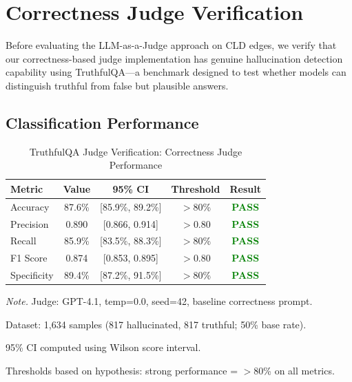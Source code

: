 \section{Correctness Judge Verification}

Before evaluating the LLM-as-a-Judge approach on CLD edges, we verify that our correctness-based judge implementation has genuine hallucination detection capability using TruthfulQA---a benchmark designed to test whether models can distinguish truthful from false but plausible answers.

\subsection{Classification Performance}

\begin{table}[H]
\centering
\caption{TruthfulQA Judge Verification: Correctness Judge Performance}
\label{tab:truthqa_performance}
\begin{threeparttable}
\begin{tabular}{lcccc}
\toprule
\textbf{Metric} & \textbf{Value} & \textbf{95\% CI} & \textbf{Threshold} & \textbf{Result} \\
\midrule
Accuracy & 87.6\% & [85.9\%, 89.2\%] & $>$80\% & \textcolor{green}{\textbf{PASS}} \\
Precision & 0.890 & [0.866, 0.914] & $>$0.80 & \textcolor{green}{\textbf{PASS}} \\
Recall & 85.9\% & [83.5\%, 88.3\%] & $>$80\% & \textcolor{green}{\textbf{PASS}} \\
F1 Score & 0.874 & [0.853, 0.895] & $>$0.80 & \textcolor{green}{\textbf{PASS}} \\
Specificity & 89.4\% & [87.2\%, 91.5\%] & $>$80\% & \textcolor{green}{\textbf{PASS}} \\
\bottomrule
\end{tabular}
\begin{tablenotes}
\small
\item \textit{Note.} Judge: GPT-4.1, temp=0.0, seed=42, baseline correctness prompt.
\item Dataset: 1,634 samples (817 hallucinated, 817 truthful; 50\% base rate).
\item 95\% CI computed using Wilson score interval.
\item Thresholds based on hypothesis: strong performance = $>$80\% on all metrics.
\end{tablenotes}
\end{threeparttable}
\end{table}

